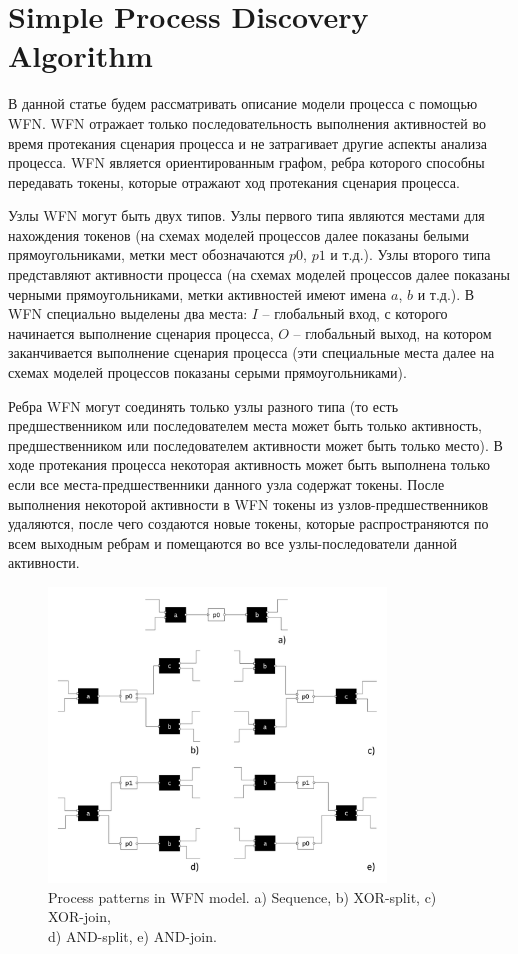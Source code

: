 \documentclass[
11pt,%
tightenlines,%
twoside,%
onecolumn,%
nofloats,%
nobibnotes,%
nofootinbib,%
superscriptaddress,%
noshowpacs,%
centertags]%
{revtex4}
\begin{document}
\section{Simple Process Discovery Algorithm}

В данной статье будем рассматривать описание модели процесса с помощью WFN.
WFN отражает только последовательность выполнения активностей во время протекания сценария процесса и не затрагивает другие аспекты анализа процесса.
WFN является ориентированным графом, ребра которого способны передавать токены, которые отражают ход протекания сценария процесса.

Узлы WFN могут быть двух типов.
Узлы первого типа являются местами для нахождения токенов (на схемах моделей процессов далее показаны белыми прямоугольниками, метки мест обозначаются $p0$, $p1$ и т.д.).
Узлы второго типа представляют активности процесса (на схемах моделей процессов далее показаны черными прямоугольниками, метки активностей имеют имена $a$, $b$ и т.д.).
В WFN специально выделены два места: $I$ -- глобальный вход, с которого начинается выполнение сценария процесса, $O$ -- глобальный выход, на котором заканчивается выполнение сценария  процесса (эти специальные места далее на схемах моделей процессов показаны серыми прямоугольниками).

Ребра WFN могут соединять только узлы разного типа (то есть предшественником или последователем места может быть только активность, предшественником или последователем активности может быть только место).
В ходе протекания процесса некоторая активность может быть выполнена только если все места-предшественники данного узла содержат токены.
После выполнения некоторой активности в WFN токены из узлов-предшественников удаляются, после чего создаются новые токены, которые распространяются по всем выходным ребрам и помещаются во все узлы-последователи данной активности.

\begin{figure}[h]
\setcaptionmargin{5mm}
\onelinecaptionsfalse %
\includegraphics[width=0.8\textwidth]{pics/wfn-patterns.pdf}
\caption{Process patterns in WFN model. a) Sequence, b) XOR-split, c) XOR-join,\\d) AND-split, e) AND-join.}
\label{fig:wfn-patterns}
\end{figure}
\end{document}
